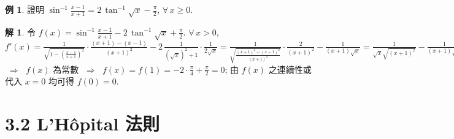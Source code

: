 \documentclass[12pt]{extarticle}
\newcommand{\ds}{\displaystyle}
\newcommand{\ie}{\;\Longrightarrow\;}
\theoremstyle{definition}
\newtheorem*{thm}{定理}
\newtheorem*{ex}{例}
\newtheorem*{sol}{解}
\begin{document}
\begin{ex}
  證明 $\ds\sin^{-1}\frac{x - 1}{x + 1} = 2\,\tan^{-1}\sqrt{x} - \frac{\pi}{2}$, $\forall\,x\geqslant 0$. 
\end{ex}

\begin{sol}
  令 $\ds f(x) = \sin^{-1}\frac{x - 1}{x + 1} - 2\,\tan^{-1}\sqrt{x} + \frac{\pi}{2}$. $\forall\,x > 0$, $\ds f'(x) = \frac{1}{\sqrt{1 - (\frac{x - 1}{x + 1})^2}}\cdot\frac{(x + 1) - (x - 1)}{(x + 1)^2} - 2\,\frac{1}{(\sqrt{x})^2 + 1}\cdot\frac{1}{2\sqrt{x}} = \frac{1}{\sqrt{\frac{(x + 1)^2 - (x - 1)^2}{(x + 1)^2}}}\cdot\frac{2}{(x + 1)^2} - \frac{1}{(x + 1)\sqrt{x}} = \frac{1}{\sqrt{x}\sqrt{(x + 1)^2}} - \frac{1}{(x + 1)\sqrt{x}} = \frac{1}{\sqrt{x}|x + 1|} - \frac{1}{(x + 1)\sqrt{x}} = 0$ $\ie$ $f(x)$ 為常數 $\ie$ $\ds f(x) = f(1) = -2\cdot\frac{\pi}{4} + \frac{\pi}{2} = 0$; 由 $f(x)$ 之連續性或代入 $x = 0$ 均可得 $f(0) = 0$.   
\end{sol}

\section*{3.2 L'H\^opital 法則}

\end{document}
